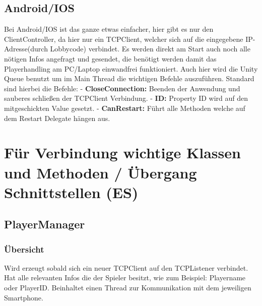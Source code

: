 \subsection{Android/IOS}
Bei Android/IOS ist das ganze etwas einfacher, hier gibt es nur den ClientController, da hier nur ein TCPClient, welcher sich auf die eingegebene IP-Adresse(durch Lobbycode) verbindet. Es werden direkt am Start auch noch alle nötigen Infos angefragt und gesendet, die benötigt werden damit das Playerhandling am PC/Laptop einwandfrei funktioniert. Auch hier wird die Unity Queue benutzt um im Main Thread die wichtigen Befehle auszuführen. Standard sind hierbei die Befehle:
\newline \tab
- \textbf{CloseConnection:} Beenden der Anwendung und sauberes schließen der \newline \tab TCPClient Verbindung.
\newline \tab
- \textbf{ID:} Property ID wird auf den mitgeschickten Value gesetzt.
\newline \tab 
- \textbf{CanRestart:} Führt alle Methoden welche auf dem Restart Delegate hängen aus.
\section{Für Verbindung wichtige Klassen und Methoden / Übergang Schnittstellen (ES)} 
\subsection{PlayerManager}
\subsubsection{Übersicht}
Wird erzeugt sobald sich ein neuer TCPClient auf den TCPListener verbindet. Hat alle relevanten Infos die der Spieler besitzt, wie zum Beispiel: Playername oder PlayerID. Beinhaltet einen Thread zur Kommunikation mit dem jeweiligen Smartphone.
